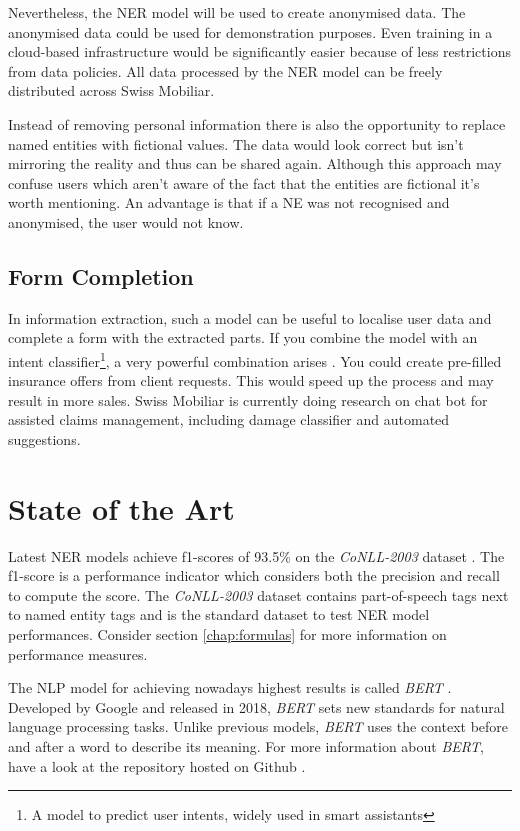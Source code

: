 Nevertheless, the NER model will be used to create anonymised data. The anonymised data could be used for demonstration purposes. Even training in a cloud-based infrastructure would be significantly easier because of less restrictions from data policies. All data processed by the NER model can be freely distributed across Swiss Mobiliar.

Instead of removing personal information there is also the opportunity to replace named entities with fictional values. The data would look correct but isn't mirroring the reality and thus can be shared again. Although this approach may confuse users which aren't aware of the fact that the entities are fictional it's worth mentioning. An advantage is that if a NE was not recognised and anonymised, the user would not know.

\subsection{Form Completion}

In information extraction, such a model can be useful to localise user data and complete a form with the extracted parts. If you combine the model with an intent classifier\footnote{A model to predict user intents, widely used in smart assistants}, a very powerful combination arises \cite{jain18}. You could create pre-filled insurance offers from client requests. This would speed up the process and may result in more sales. Swiss Mobiliar is currently doing research on chat bot for assisted claims management, including damage classifier and automated suggestions.

\section{State of the Art}

Latest NER models achieve f1-scores of 93.5\% on the \emph{CoNLL-2003} dataset \cite{art19}. The f1-score is a performance indicator which considers both the precision and recall to compute the score. The \emph{CoNLL-2003} dataset contains part-of-speech tags next to named entity tags and is the standard dataset to test NER model performances. Consider section \ref{chap:formulas} for more information on performance measures.

The NLP model for achieving nowadays highest results is called \emph{BERT} \cite{bert18}. Developed by Google and released in 2018, \emph{BERT} sets new standards for natural language processing tasks. Unlike previous models, \emph{BERT} uses the context before and after a word to describe its meaning. For more information about \emph{BERT}, have a look at the repository hosted on Github \cite{bert-gh}.

